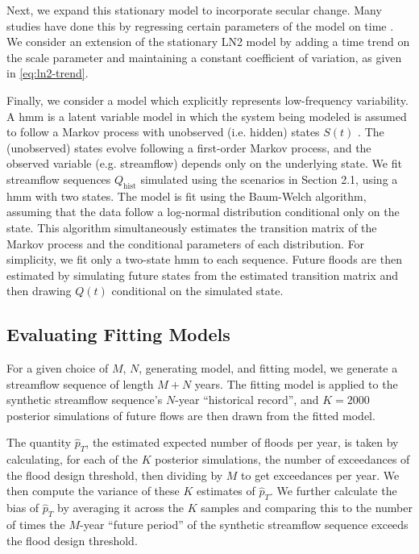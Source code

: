 \documentclass[
]{agujournal2018}
\makeatletter
\newcommand{\eg}{e.g.\@\xspace}
\newcommand{\ie}{i.e.\@\xspace}
\makeatother
\begin{document}
Next, we expand this stationary model to incorporate secular change.
Many studies have done this by regressing certain parameters of the model on time \citep{Merz:2014gf, Salas:2018ge}.
We consider an extension of the stationary LN2 model by adding a time trend on the scale parameter and maintaining a constant coefficient of variation, as given in \cref{eq:ln2-trend}.

Finally, we consider a model which explicitly represents low-frequency variability.
A \gls{hmm} is a latent variable model in which the system being modeled is assumed to follow a Markov process with unobserved (\ie{} hidden) states $S(t)$ \citep{Rabiner:1986jk}.
The (unobserved) states evolve following a first-order Markov process, and the observed variable (\eg streamflow) depends only on the underlying state.
We fit  streamflow sequences $Q_\text{hist}$ simulated using the scenarios in Section 2.1, using a \gls{hmm} with two states.
The model is fit using the Baum-Welch algorithm, assuming that the data follow a log-normal distribution conditional only on the state.
This algorithm simultaneously estimates the transition matrix of the Markov process and the conditional parameters of each distribution.
For simplicity, we fit only a two-state \gls{hmm} to each sequence.
Future floods are then estimated by simulating future states from the estimated transition matrix and then drawing $Q(t)$ conditional on the simulated state.

\subsection{Evaluating Fitting Models}\label{sec:methods-evaluating}

For a given choice of $M$, $N$, generating model, and fitting model, we generate a streamflow sequence of length $M+N$ years.
The fitting model is applied to the synthetic streamflow sequence's $N$-year ``historical record'', and $K=2000$ posterior simulations of future flows are then drawn from the fitted model.

The quantity $\hat{p}_T$, the estimated expected number of floods per year, is taken by calculating, for each of the $K$ posterior simulations, the number of exceedances of the flood design threshold, then dividing by $M$ to get exceedances per year.
We then compute the variance of these $K$ estimates of $\hat{p}_T$.
We further calculate the bias of $\hat{p}_T$ by averaging it across the $K$ samples and comparing this to the number of times the $M$-year ``future period'' of the synthetic streamflow sequence exceeds the flood design threshold.
\end{document}
